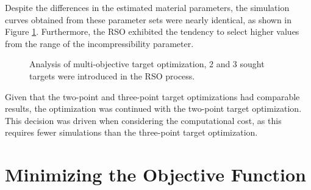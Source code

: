 Despite the differences in the estimated material parameters, the simulation curves obtained  
from these parameter sets were nearly identical, as shown in Figure \ref{fig:1vs2vs3points}.
Furthermore, the RSO exhibited the tendency to select higher values from the range of the 
incompressibility parameter.

\begin{figure}%
    \centering
   \quad
   \caption[Multi-objective optimization comparison]{Analysis of multi-objective target optimization, \SI{2}{} and \SI{3}{} sought targets were introduced in the RSO process. }%
   \label{fig:1vs2vs3points}%
\end{figure}

Given that the two-point and three-point target optimizations had comparable results, the optimization
was continued with the two-point target optimization. This decision was driven when considering 
the computational cost, as this requires fewer simulations than the three-point target optimization.


\section{Minimizing the Objective Function}

